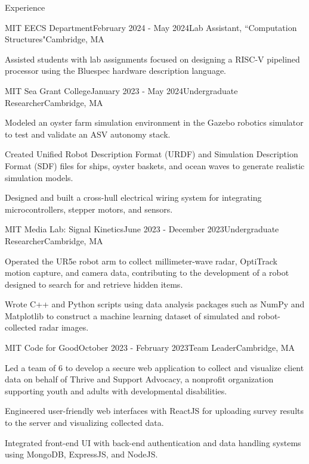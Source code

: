 \documentclass[
	10pt,
]{resume}
\begin{document}
\begin{rSection}{Experience}
	\begin{rSubsection}{MIT EECS Department}{February 2024 - May 2024}{Lab Assistant, ``Computation Structures"}{Cambridge, MA}
    \item Assisted students with lab assignments focused on designing a RISC-V pipelined processor using the Bluespec hardware description language.
	\end{rSubsection}

	\begin{rSubsection}{MIT Sea Grant College}{January 2023 - May 2024}{Undergraduate Researcher}{Cambridge, MA}
    \item Modeled an oyster farm simulation environment in the Gazebo robotics simulator to test and validate an ASV autonomy stack.
    \item Created Unified Robot Description Format (URDF) and Simulation Description Format (SDF) files for ships, oyster baskets, and ocean waves to generate realistic simulation models.
    \item Designed and built a cross-hull electrical wiring system for integrating microcontrollers, stepper motors, and sensors.
    \end{rSubsection}

	\begin{rSubsection}{MIT Media Lab: Signal Kinetics}{June 2023 - December 2023}{Undergraduate Researcher}{Cambridge, MA}
    \item Operated the UR5e robot arm to collect millimeter-wave radar, OptiTrack motion capture, and camera data, contributing to the development of a robot designed to search for and retrieve hidden items.
    \item Wrote C++ and Python scripts using data analysis packages such as NumPy and Matplotlib to construct a machine learning dataset of simulated and robot-collected radar images.
	\end{rSubsection}

	\begin{rSubsection}{MIT Code for Good}{October 2023 - February 2023}{Team Leader}{Cambridge, MA}
	\item Led a team of 6 to develop a secure web application to collect and visualize client data on behalf of Thrive and Support Advocacy, a nonprofit organization supporting youth and adults with developmental disabilities.
	\item Engineered user-friendly web interfaces with ReactJS for uploading survey results to the server and visualizing collected data.
    \item Integrated front-end UI with back-end authentication and data handling systems using MongoDB, ExpressJS, and NodeJS.
	\end{rSubsection}


\end{rSection}
\end{document}
